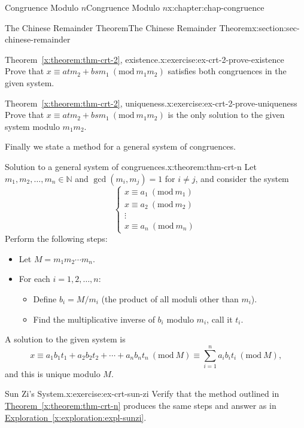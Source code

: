 \documentclass[oneside,10pt,]{book}
\newcommand{\xreffont}{\relax}
\numberwithin{equation}{section}
\newcommand{\Mod}[1]{\ \left(\mathrm{mod}\ #1\right)}
\begin{document}
\begin{chapterptx}{Congruence Modulo \(n\)}{}{Congruence Modulo \(n\)}{}{}{x:chapter:chap-congruence}
\begin{sectionptx}{The Chinese Remainder Theorem}{}{The Chinese Remainder Theorem}{}{}{x:section:sec-chinese-remainder}
\begin{inlineexercise}{Theorem~{\xreffont\ref*{x:theorem:thm-crt-2}}, existence.}{x:exercise:ex-crt-2-prove-existence}
Prove that \(x \equiv atm_2 + bsm_1 \Mod{m_1m_2}\) satisfies both congruences in the given system.%
\end{inlineexercise}
\begin{inlineexercise}{Theorem~{\xreffont\ref*{x:theorem:thm-crt-2}}, uniqueness.}{x:exercise:ex-crt-2-prove-uniqueness}%
Prove that \(x \equiv atm_2 + bsm_1 \Mod{m_1m_2}\) is the only solution to the given system modulo \(m_1m_2\).%
\end{inlineexercise}
Finally we state a method for a general system of congruences.%
\begin{theorem}{Solution to a general system of congruences.}{}{x:theorem:thm-crt-n}%
Let \(m_1,m_2,\ldots,m_n \in \mathbb{N}\) and \(\gcd(m_i,m_j) = 1\) for \(i \ne j\), and consider the system%
\begin{equation*}
\begin{cases} x \equiv a_1 \Mod{m_1} \\ x \equiv a_2 \Mod{m_2} \\ \vdots \\ x \equiv a_n \Mod{m_n} \end{cases}
\end{equation*}
Perform the following steps:%
\begin{itemize}[label=\textbullet]
\item{}Let \(M = m_1m_2\cdots m_n\).%
\item{}For each \(i = 1,2,\ldots,n\):%
\begin{itemize}[label=$\circ$]
\item{}Define \(b_i = M/m_i\) (the product of all moduli other than \(m_i\)).%
\item{}Find the multiplicative inverse of \(b_i\) modulo \(m_i\), call it \(t_i\).%
\end{itemize}
%
\end{itemize}
A solution to the given system is%
\begin{equation*}
x \equiv a_1b_1t_1 + a_2b_2t_2 + \cdots + a_nb_nt_n \Mod{M}\equiv \sum_{i=1}^n a_ib_it_i \Mod{M}\text{,}
\end{equation*}
and this is unique modulo \(M\).%
\end{theorem}
\begin{inlineexercise}{Sun Zi's System.}{x:exercise:ex-crt-sun-zi}%
Verify that the method outlined in \hyperref[x:theorem:thm-crt-n]{Theorem~{\xreffont\ref{x:theorem:thm-crt-n}}} produces the same steps and answer as in \hyperref[x:exploration:expl-sunzi]{Exploration~{\xreffont\ref{x:exploration:expl-sunzi}}}.%

\end{inlineexercise}
\end{sectionptx}
\end{chapterptx}
\end{document}
